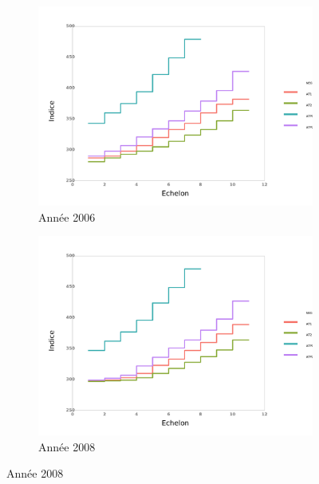 \documentclass[11pt,a4paper]{article}
\begin{document}
\begin{figure}[ht] 
  \caption{Évolution des grilles: niveau relatif des grades}
  \label{echelon_by_date} 
  \begin{subfigure}[b]{0.55\linewidth}
      \caption{Année 2006} 
    \label{echelon_by_neg_0} 
    \centering
    \includegraphics[width=1\linewidth]{0_grille_by_date.pdf} 
    \vspace{4ex}
  \end{subfigure}%
  \begin{subfigure}[b]{0.55\linewidth}
      \caption{Année 2008} 
    \label{echelon_by_neg_1} 
    \centering
    \includegraphics[width=1\linewidth]{1_grille_by_date.pdf} 
    \vspace{4ex}
  \end{subfigure} 

\end{figure}
\end{document}
